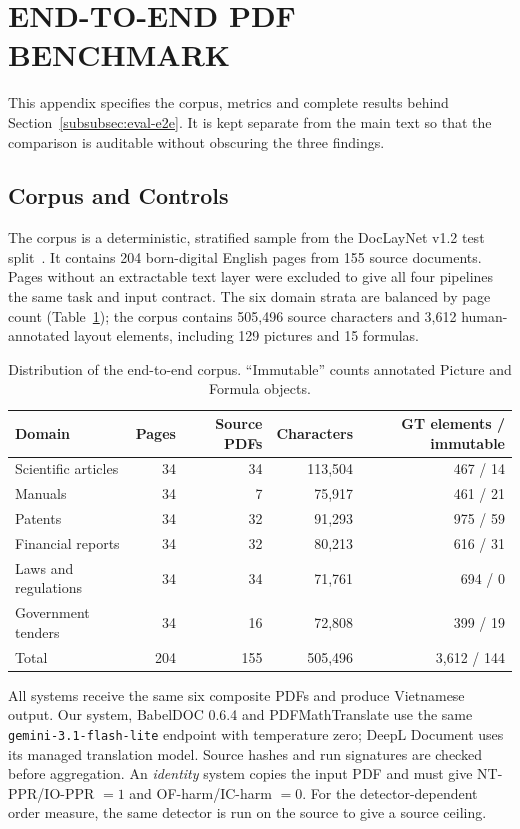 \section{END-TO-END PDF BENCHMARK}
\label{app:e2e-benchmark}

This appendix specifies the corpus, metrics and complete results behind
Section~\ref{subsubsec:eval-e2e}. It is kept separate from the main text so that
the comparison is auditable without obscuring the three findings.

\subsection{Corpus and Controls}

The corpus is a deterministic, stratified sample from the DocLayNet v1.2 test
split~\citep{doclaynet}. It contains 204 born-digital English pages from 155
source documents. Pages without an extractable text layer were excluded to give
all four pipelines the same task and input contract. The six
domain strata are balanced by page count (Table~\ref{tab:app-e2e-corpus}); the
corpus contains 505{,}496 source characters and 3{,}612 human-annotated layout
elements, including 129 pictures and 15 formulas.

\begin{table}[H]
\centering
\caption{Distribution of the end-to-end corpus. ``Immutable'' counts annotated
Picture and Formula objects.}
\label{tab:app-e2e-corpus}
\small
\begin{tabular}{@{}lrrrr@{}}
\toprule
Domain & Pages & Source PDFs & Characters & GT elements / immutable \\
\midrule
Scientific articles  & 34 & 34 & 113{,}504 & 467 / 14 \\
Manuals              & 34 &  7 &  75{,}917 & 461 / 21 \\
Patents              & 34 & 32 &  91{,}293 & 975 / 59 \\
Financial reports    & 34 & 32 &  80{,}213 & 616 / 31 \\
Laws and regulations & 34 & 34 &  71{,}761 & 694 /  0 \\
Government tenders   & 34 & 16 &  72{,}808 & 399 / 19 \\
\midrule
Total                & 204 & 155 & 505{,}496 & 3{,}612 / 144 \\
\bottomrule
\end{tabular}
\end{table}

All systems receive the same six composite PDFs and produce Vietnamese output.
Our system, BabelDOC 0.6.4 and PDFMathTranslate use the same
\texttt{gemini-3.1-flash-lite} endpoint with temperature zero; DeepL Document
uses its managed translation model. Source hashes and run signatures are checked
before aggregation. An \emph{identity} system copies the input PDF and must give
NT-PPR/IO-PPR $=1$ and OF-harm/IC-harm $=0$. For the detector-dependent order
measure, the same detector is run on the source to give a source ceiling.


